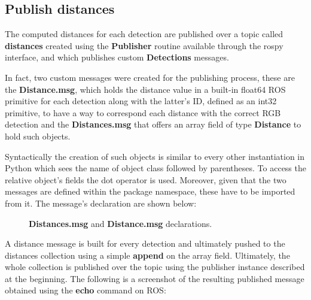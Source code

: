 \subsection{Publish distances}

The computed distances for each detection are published over a topic called \textbf{distances} created using the \textbf{Publisher} routine available through the rospy interface, and which publishes custom \textbf{Detections} messages. 

In fact, two custom messages were created for the publishing process, these are the \textbf{Distance.msg}, which holds the distance value in a built-in float64 ROS primitive for each detection along with the latter's ID, defined as an int32 primitive, to have a way to correspond each distance with the correct RGB detection and the \textbf{Distances.msg} that offers an array field of type \textbf{Distance} to hold such objects.

Syntactically the creation of such objects is similar to every other instantiation in Python which sees the name of object class followed by parentheses. To access the relative object's fields the dot operator is used. Moreover, given that the two messages are defined within the package namespace, these have to be imported from it. The message's declaration are shown below:

\begin{figure}[H]
    \centering
    \qquad
    \caption{\textbf{Distances.msg} and \textbf{Distance.msg} declarations.}%
    \label{fig:example}%
\end{figure}

A distance message is built for every detection and ultimately pushed to the distances collection using a simple \textbf{append} on the array field. Ultimately, the whole collection is published over the topic using the publisher instance described at the beginning. The following is a screenshot of the resulting published message obtained using the \textbf{echo} command on ROS:

